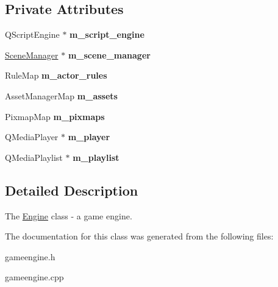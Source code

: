 \subsection*{Private Attributes}
\begin{DoxyCompactItemize}
\item 
\mbox{\label{classmfg_1_1_engine_ad2401d178403008525cfd6a1caa85ae5}} 
Q\+Script\+Engine $\ast$ {\bfseries m\+\_\+script\+\_\+engine}
\item 
\mbox{\label{classmfg_1_1_engine_a24bac160b2daf5247d6b5d70499311f6}} 
\hyperlink{class_scene_manager}{Scene\+Manager} $\ast$ {\bfseries m\+\_\+scene\+\_\+manager}
\item 
\mbox{\label{classmfg_1_1_engine_a8b648c4f7a59c9993a30179b4711c92b}} 
Rule\+Map {\bfseries m\+\_\+actor\+\_\+rules}
\item 
\mbox{\label{classmfg_1_1_engine_a18f50fe08592b70969ff6c8113f18753}} 
Asset\+Manager\+Map {\bfseries m\+\_\+assets}
\item 
\mbox{\label{classmfg_1_1_engine_ab9813b744a07242fc2a3adc7d796cd20}} 
Pixmap\+Map {\bfseries m\+\_\+pixmaps}
\item 
\mbox{\label{classmfg_1_1_engine_ac423142f783829c549531219290966e2}} 
Q\+Media\+Player $\ast$ {\bfseries m\+\_\+player}
\item 
\mbox{\label{classmfg_1_1_engine_ae6f5890f6e9a33a6891957e671fbf41c}} 
Q\+Media\+Playlist $\ast$ {\bfseries m\+\_\+playlist}
\end{DoxyCompactItemize}


\subsection{Detailed Description}
The \hyperlink{classmfg_1_1_engine}{Engine} class -\/ a game engine. 

The documentation for this class was generated from the following files\+:\begin{DoxyCompactItemize}
\item 
gameengine.\+h\item 
gameengine.\+cpp\end{DoxyCompactItemize}
